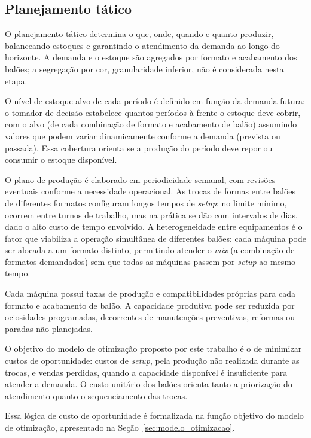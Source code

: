\documentclass[fleqn,12pt,a4paper]{article}
\begin{document}
\subsection{Planejamento tático}

O planejamento tático determina o que, onde, quando e quanto produzir, balanceando estoques e garantindo o atendimento da demanda ao longo do horizonte. A demanda e o estoque são agregados por formato e acabamento dos balões; a segregação por cor, granularidade inferior, não é considerada nesta etapa.

O nível de estoque alvo de cada período é definido em função da demanda futura: o tomador de decisão estabelece quantos períodos à frente o estoque deve cobrir, com o alvo (de cada combinação de formato e acabamento de balão) assumindo valores que podem variar dinamicamente conforme a demanda (prevista ou passada). Essa cobertura orienta se a produção do período deve repor ou consumir o estoque disponível.

O plano de produção é elaborado em periodicidade semanal, com revisões eventuais conforme a necessidade operacional. As trocas de formas entre balões de diferentes formatos configuram longos tempos de \textit{setup}: no limite mínimo, ocorrem entre turnos de trabalho, mas na prática se dão com intervalos de dias, dado o alto custo de tempo envolvido. A heterogeneidade entre equipamentos é o fator que viabiliza a operação simultânea de diferentes balões: cada máquina pode ser alocada a um formato distinto, permitindo atender o \textit{mix} (a combinação de formatos demandados) sem que todas as máquinas passem por \textit{setup} ao mesmo tempo.

Cada máquina possui taxas de produção e compatibilidades próprias para cada formato e acabamento de balão. A capacidade produtiva pode ser reduzida por ociosidades programadas, decorrentes de manutenções preventivas, reformas ou paradas não planejadas.

O objetivo do modelo de otimização proposto por este trabalho é o de minimizar custos de oportunidade: custos de \textit{setup}, pela produção não realizada durante as trocas, e vendas perdidas, quando a capacidade disponível é insuficiente para atender a demanda. O custo unitário dos balões orienta tanto a priorização do atendimento quanto o sequenciamento das trocas.

Essa lógica de custo de oportunidade é formalizada na função objetivo do modelo de otimização, apresentado na Seção~\ref{sec:modelo_otimizacao}.
\end{document}
